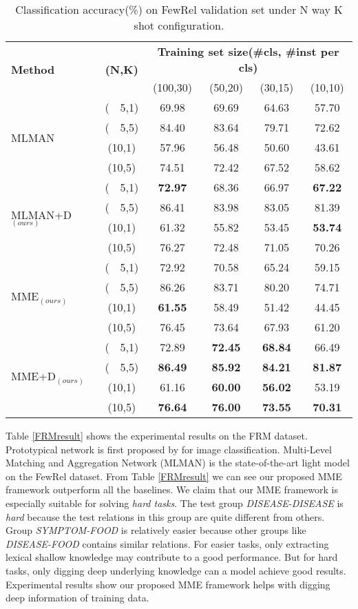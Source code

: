 \begin{table*}[ht]
\centering
\small
\begin{tabular}{|l|c|c|c|c|c|}
\hline
\multirow{2}{*}{\textbf{Method}} & \multirow{2}{*}{\textbf{(N,K)}} & \multicolumn{4}{c|}{\textbf{Training set size(\#cls, \#inst per cls)}} \\ \cline{3-6}
& & (100,30) & (50,20) & (30,15) & (10,10) \\ \hline
\multirow{4}{*}{MLMAN} & (~~5,1) &69.98 &69.69 &64.63 &57.70 \\
& (~~5,5) &84.40 &83.64 & 79.71&72.62 \\
& (10,1) &57.96 &56.48 & 50.60&43.61 \\
& (10,5) &74.51 &72.42 & 67.52&58.62 \\ \hline \hline
\multirow{4}{*}{MLMAN+D$_{(ours)}$} & (~~5,1) &\textbf{72.97} & 68.36& 66.97&\textbf{67.22} \\
& (~~5,5) &86.41 &83.98 & 83.05&81.39 \\
& (10,1) &61.32 & 55.82& 53.45&\textbf{53.74} \\
& (10,5) &76.27 & 72.48&71.05 &70.26 \\ \hline
\multirow{4}{*}{MME$_{(ours)}$} & (~~5,1) & 72.92& 70.58&65.24 &59.15 \\
& (~~5,5) & 86.26& 83.71&80.20 & 74.71\\
& (10,1) &\textbf{61.55} & 58.49&51.42 & 44.45\\
& (10,5) & 76.45& 73.64&67.93 & 61.20\\ \hline
\multirow{4}{*}{MME+D$_{(ours)}$} & (~~5,1) &72.89 &\textbf{72.45} & \textbf{68.84} &66.49 \\
& (~~5,5) & \textbf{86.49} & \textbf{85.92}& \textbf{84.21} &\textbf{81.87} \\
& (10,1) &61.16 &\textbf{60.00} & \textbf{56.02} &53.19 \\
& (10,5) &\textbf{76.64} & \textbf{76.00}& \textbf{73.55} &\textbf{70.31} \\ \hline
\end{tabular}
\caption{Classification accuracy(\%) on FewRel validation set under N way K shot configuration.}
\label{FewRelval}
\end{table*}

Table \ref{FRMresult} shows the experimental results on the FRM dataset. Prototypical network is first proposed by \citet{proto} for image classification. Multi-Level Matching and Aggregation Network (MLMAN) \citep{ye-ling-2019-multi} is the state-of-the-art light model on the FewRel dataset. From Table \ref{FRMresult} we can see our proposed MME framework outperform all the baselines. We claim that our MME framework is especially suitable for solving \emph{hard tasks}.
The test group \emph{DISEASE-DISEASE} is \emph{hard} because the test relations in this group are quite different from others. Group \emph{SYMPTOM-FOOD} is relatively easier because other groups like \emph{DISEASE-FOOD} contains similar relations. For easier tasks, only extracting lexical shallow knowledge may contribute to a good performance. But for hard tasks, only digging deep underlying knowledge can a model achieve good results. Experimental results show our proposed MME framework helps with digging deep information of training data.

